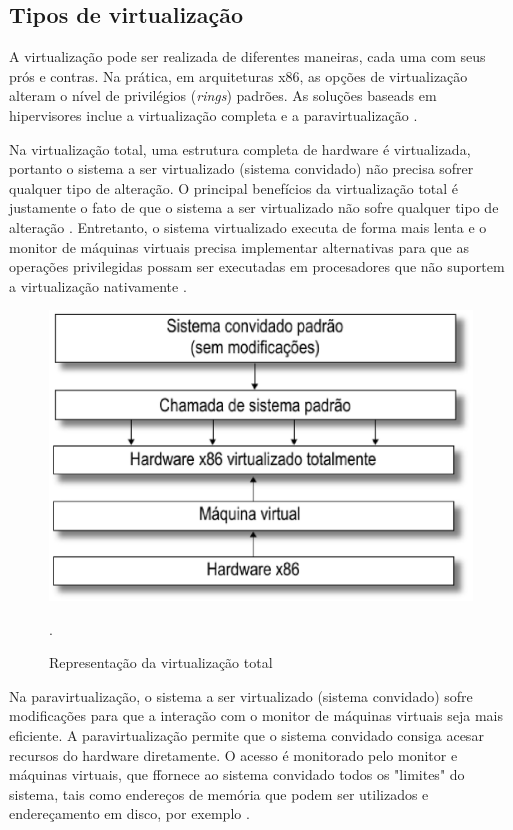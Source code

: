 \subsection{Tipos de virtualização}
A virtualização pode ser realizada de diferentes maneiras, cada uma com seus prós e contras. Na prática, em arquiteturas x86, as opções de virtualização alteram o nível de privilégios (\textit{rings}) padrões. As soluções baseads em hipervisores inclue a virtualização completa e a paravirtualização \cite{manoel}.

Na virtualização total, uma estrutura completa de hardware é virtualizada, portanto o sistema a ser virtualizado (sistema convidado) não precisa sofrer qualquer tipo de alteração. O principal benefícios da virtualização total é justamente o fato de que o sistema a ser virtualizado não sofre qualquer tipo de alteração \cite{marcos}. Entretanto, o sistema virtualizado executa de forma mais lenta e o monitor de máquinas virtuais precisa implementar alternativas para que as operações privilegidas possam ser executadas em procesadores que não suportem a virtualização nativamente \cite{marcos}.

\begin{figure}[!htb]
\centering
\includegraphics [keepaspectratio=true,scale=0.40]{figuras/full_virtualization.eps}
\caption{Representação da virtualização total}
\cite{marcos}.
\label{full_virtualization}
\end{figure}

Na paravirtualização, o sistema a ser virtualizado (sistema convidado) sofre modificações para que a interação com o monitor de máquinas virtuais seja mais eficiente. A paravirtualização permite que o sistema convidado consiga acesar recursos do hardware diretamente. O acesso é monitorado pelo monitor e máquinas virtuais, que ffornece ao sistema convidado todos os "limites" do sistema, tais como endereços de memória que podem ser utilizados e endereçamento em disco, por exemplo \cite{marcos}.

